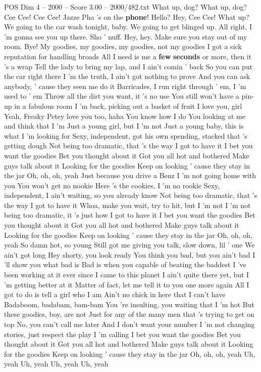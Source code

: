 \begin{textsample}{POS Dim 4 – 2000 – Score 3.00 – 2000/482.txt}  \label{ex:f4_pos_002}
What up, dog?
What up, dog?
Cee Cee!
Cee Cee!
Jazze Pha 's on the \textbf{phone}!
Hello?
Hey, Cee Cee!
What up?
We going to the car wash tonight, baby.
We going to get blinged up.
All right, I 'm gonna see you up there.
Sho ' nuff.
Hey, hey.
Make sure you stay out of my room.
Bye!
My goodies, my goodies, my goodies, not my goodies I got a sick reputation for handling broads All I need is me a \textbf{few} \textbf{seconds} or more, then it 's a wrap Tell the lady to bring my lap, and I ain't comin ' back So you can put the car right there I 'm the truth, I ain't got nothing to prove And you can ask anybody, ' cause they seen me do it Barricades, I run right through ' em, I 'm used to ' em Throw all the dirt you want, it 's no use You still won't have a pin-up in a fabulous room I 'm back, picking out a basket of fruit I love you, girl Yeah, Freaky Petey love you too, haha You know how I do You looking at me and think that I 'm Just a young girl, but I 'm not Just a young baby, this is what I 'm looking for Sexy, independent, got his own spending, stacked that 's getting dough Not being too dramatic, that 's the way I got to have it I bet you want the goodies Bet you thought about it Got you all hot and bothered Make guys talk about it Looking for the goodies Keep on looking ' cause they stay in the jar Oh, oh, oh, yeah Just because you drive a Benz I 'm not going home with you You won't get no nookie Here 's the cookies, I 'm no rookie Sexy, independent, I ain't waiting, so you already know Not being too dramatic, that 's the way I got to have it Whoa, make you wait, try to hit, but I 'm not I 'm not being too dramatic, it 's just how I got to have it I bet you want the goodies Bet you thought about it Got you all hot and bothered Make guys talk about it Looking for the goodies Keep on looking ' cause they stay in the jar Oh, oh, oh, yeah So damn hot, so young Still got me giving you talk, slow down, lil ' one We ain't got long Hey shorty, you look ready You think you bad, but you ain't bad I 'll show you what bad is Bad is when you capable of beating the baddest I 've been working at it ever since I came to this planet I ain't quite there yet, but I 'm getting better at it Matter of fact, let me tell it to you one more again All I got to do is tell a girl who I am Ain't no chick in here that I can't have Badaboom, badabam, bam-bam You 're insulting, you waiting that I 'm hot But these goodies, boy, are not Just for any of the many men that 's trying to get on top No, you can't call me later And I don't want your number I 'm not changing stories, just respect the play I 'm calling I bet you want the goodies Bet you thought about it Got you all hot and bothered Make guys talk about it Looking for the goodies Keep on looking ' cause they stay in the jar Oh, oh, oh, yeah Uh, yeah Uh, yeah Uh, yeah Uh, yeah

\end{textsample}
